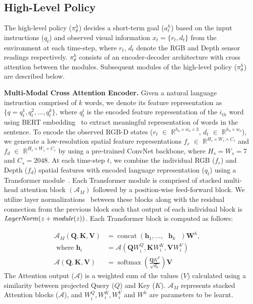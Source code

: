 \documentclass[letter, 10pt, conference]{ieeeconf}
\begin{document}
\subsection{High-Level Policy}
The high-level policy ($\pi^{h}_{\theta}$) decides a short-term goal ($a^{h}_{t}$) based on the input instructions ($q_{t}$) and observed visual information $x_{t} = \{ r_{t}, d_{t}\}$ from the environment at each time-step, where $r_{t}$, $d_{t}$ denote the RGB and Depth sensor readings respectively. $\pi^{h}_{\theta}$ consists of an encoder-decoder architecture with cross attention between the modules. Subsequent modules of the high-level policy ($\pi^{h}_{\theta}$) are described below.

\textbf{Multi-Modal Cross Attention Encoder.}
Given a natural language instruction comprised of $k$ words, we denote its feature representation as $\{q = q^{1}_{t}, q^{2}_{t}, \ldots, q^{k}_{t} \}$, where $q^{i}_{t}$ is the encoded feature representation of the $i_{th}$ word using BERT embedding~\cite{devlin-etal-2019-bert} to extract meaningful representation of words in the sentence.
To encode the observed RGB-D states ($r_{t}$ $\in$ $\mathds{R}^{h_{o}\times w_{o}\times 3 }$, $d_{t}$ $\in$ $\mathds{R}^{h_{o}\times w_{o}}$), we generate a low-resolution spatial feature representations $f_{r}$ $\in$ $\mathds{R}^{H_{s}\times W_{s}\times C_{s}}$ and $f_{d}$ $\in$ $\mathds{R}^{H_{s}\times W_{s}\times C_{s}}$ by using a pre-trained ConvNet backbone, where $H_{s}=W_{s} = 7$ and $C_{s}=2048$.
At each time-step $t$, we combine the individual RGB ($f_{r}$) and Depth ($f_{d}$) spatial features with encoded language representation ($q_{t}$) using a Transformer module~\cite{NIPS2017_7181}. Each Transformer module is comprised of stacked multi-head attention block $(\mathcal{A}_{M})$ followed by a position-wise feed-forward block. We utilize layer normalizations~\cite{ba2016layer} between these blocks along with the residual connection from the previous block such that output of each individual block is $\it{LayerNorm}(z + module(z))$. Each Transformer block is computed as follows:

\begin{equation}\begin{aligned}
\mathcal{A}_{M}(\boldsymbol{Q}, \boldsymbol{K}, \boldsymbol{V}) &=\operatorname {concat}(\boldsymbol{h}_{1},\ldots, \text{ $\boldsymbol{h}_{k}$ }) \boldsymbol{W}^{h}, \\
\text { where $\boldsymbol{h}_{i}$ }&= \mathcal{A}\left(\boldsymbol{Q} W_{i}^{Q}, \boldsymbol{K} W_{i}^{K}, \boldsymbol{V} W_{i}^{V}\right) \\
\mathcal{A}(\boldsymbol{Q}, \boldsymbol{K}, \boldsymbol{V})&=\operatorname{softmax}\left(\frac{\boldsymbol{Q} K^{T}}{\sqrt{d_{k}}}\right) \boldsymbol{V}
\label{transformer}
\end{aligned}\end{equation}
The Attention output ($\mathcal{A}$) is a weighted sum of the values ($V$) calculated using a similarity between projected Query ($Q$) and Key ($K$). $\mathcal{A}_{M}$ represents stacked Attention blocks ($\mathcal{A}$), and $W_{i}^{Q}, W_{i}^{K}, W_{i}^{V}$ and $W^{h}$ are parameters to be learnt. 
\end{document}
